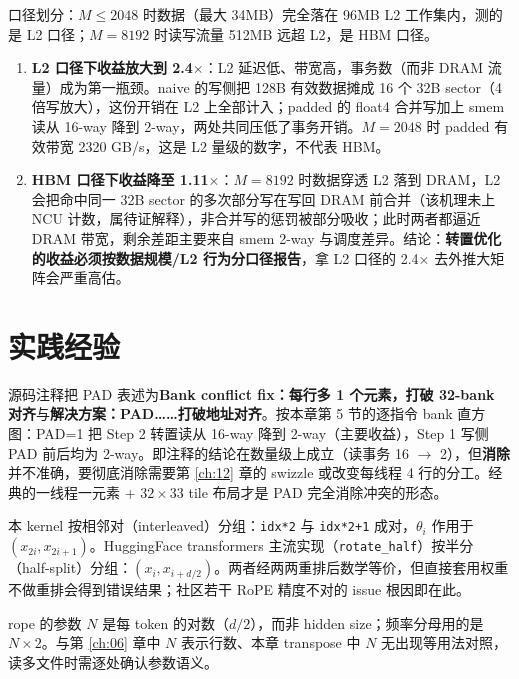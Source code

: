 口径划分：$M \le 2048$ 时数据（最大 34MB）完全落在 96MB L2 工作集内，测的是 L2 口径；$M = 8192$ 时读写流量 512MB 远超 L2，是 HBM 口径。

\begin{enumerate}
  \item \textbf{L2 口径下收益放大到 2.4$\times$}：L2 延迟低、带宽高，事务数（而非 DRAM 流量）成为第一瓶颈。naive 的写侧把 128B 有效数据摊成 16 个 32B sector（4 倍写放大），这份开销在 L2 上全部计入；padded 的 float4 合并写加上 smem 读从 16-way 降到 2-way，两处共同压低了事务开销。$M = 2048$ 时 padded 有效带宽 2320 GB/s，这是 L2 量级的数字，不代表 HBM。
  \item \textbf{HBM 口径下收益降至 1.11$\times$}：$M = 8192$ 时数据穿透 L2 落到 DRAM，L2 会把命中同一 32B sector 的多次部分写在写回 DRAM 前合并（该机理未上 NCU 计数，属待证解释），非合并写的惩罚被部分吸收；此时两者都逼近 DRAM 带宽，剩余差距主要来自 smem 2-way 与调度差异。结论：\textbf{转置优化的收益必须按数据规模/L2 行为分口径报告}，拿 L2 口径的 2.4$\times$ 去外推大矩阵会严重高估。
\end{enumerate}

\section{实践经验}

\begin{kaogu}
源码注释把 PAD 表述为\textbf{Bank conflict fix：每行多 1 个元素，打破 32-bank 对齐}与\textbf{解决方案：PAD……打破地址对齐}。按本章第 5 节的逐指令 bank 直方图：PAD=1 把 Step 2 转置读从 16-way 降到 2-way（主要收益），Step 1 写侧 PAD 前后均为 2-way。即注释的结论在数量级上成立（读事务 16 $\to$ 2），但\textbf{消除}并不准确，要彻底消除需要第 \ref{ch:12} 章的 swizzle 或改变每线程 4 行的分工。经典的一线程一元素 + $32\times33$ tile 布局才是 PAD 完全消除冲突的形态。
\end{kaogu}

\begin{kaogu}
本 kernel 按相邻对（interleaved）分组：\texttt{idx*2} 与 \texttt{idx*2+1} 成对，$\theta_i$ 作用于 $(x_{2i}, x_{2i+1})$。HuggingFace transformers 主流实现（\texttt{rotate\_half}）按半分（half-split）分组：$(x_i, x_{i+d/2})$。两者经两两重排后数学等价，但直接套用权重不做重排会得到错误结果；社区若干 RoPE 精度不对的 issue 根因即在此。
\end{kaogu}

\begin{kaogu}[F3 | 参数 N 的语义易误读]
rope 的参数 $N$ 是每 token 的对数（$d/2$），而非 hidden size；频率分母用的是 $N \times 2$。与第 \ref{ch:06} 章中 $N$ 表示行数、本章 transpose 中 $N$ 无出现等用法对照，读多文件时需逐处确认参数语义。
\end{kaogu}

